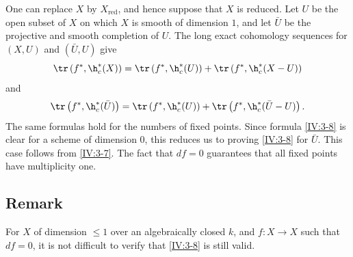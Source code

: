 One can replace $X$ by $X_\text{red}$, and hence suppose that $X$ is reduced.
Let $U$ be the open subset of $X$ on which $X$ is smooth of dimension $1$,
and let $\bar U$ be the projective and smooth completion of $U$. The long exact
cohomology sequences for $(X,U)$ and $(\bar U,U)$ give
\[
  \tr\left(f^\ast,\h_c^*(X)\right) = \tr\left(f^\ast,\h_c^*(U)\right) + \tr\left(f^\ast,\h_c^*(X-U)\right)
\]
and
\[
  \tr\left(f^\ast,\h_c^*(\bar U)\right) = \tr\left(f^\ast,\h_c^*(U)\right) + \tr\left(f^\ast,\h_c^*(\bar U-U)\right) \text{.}
\]
The same formulas hold for the numbers of fixed points. Since formula
\ref{IV:3-8} is clear for a scheme of dimension $0$, this reduces us to
proving \ref{IV:3-8} for $\bar U$. This case follows from \ref{IV:3-7}. The
fact that $d f=0$ guarantees that all fixed points have multiplicity one.






\subsection{Remark}\label{IV:3-9}

For $X$ of dimension $\leqslant 1$ over an algebraically closed $k$, and
$f:X\to X$ such that $d f=0$, it is not difficult to verify that
\ref{IV:3-8} is still valid.
